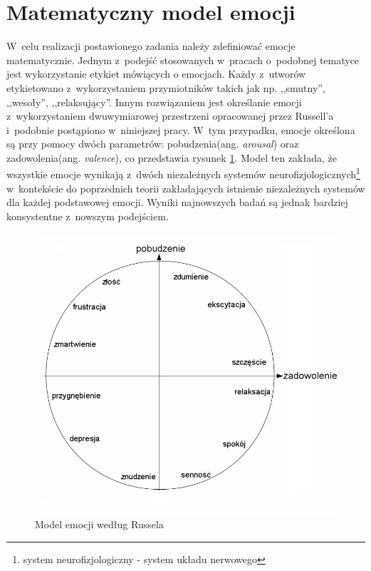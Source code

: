\section{Matematyczny model emocji}\label{rozdzial_modelEmocji}
W~celu realizacji postawionego zadania należy zdefiniować emocje matematycznie. Jednym z~podejść stosowanych w~pracach o~podobnej tematyce jest wykorzystanie etykiet mówiących o emocjach. Każdy z~utworów etykietowano z~wykorzystaniem przymiotników takich jak np. ,,smutny'', ,,wesoły'', ,,relaksujący''.  Innym rozwiązaniem jest określanie emocji z~wykorzystaniem dwuwymiarowej przestrzeni opracowanej przez Russell'a\cite{emotion} i~podobnie postąpiono w~niniejszej pracy. W~tym przypadku, emocje określona są przy pomocy dwóch parametrów: pobudzenia(ang. \emph{arousal}) oraz zadowolenia(ang. \emph{valence}), co przedstawia rysunek \ref{russelModel}. Model ten zakłada, że wszystkie emocje wynikają z~dwóch niezależnych systemów neurofizjologicznych\footnote{system neurofizjologiczny - system układu nerwowego} w~kontekście do poprzednich teorii zakładających istnienie niezależnych systemów dla każdej podstawowej emocji. Wyniki najnowszych badań są jednak bardziej konsystentne z~nowszym podejściem\cite{emotion}.


\begin{figure}[ht!]
\centering
\includegraphics[scale=0.5]{res/emotionModel.png}
\caption{Model emocji według Russela}\label{russelModel}
\end{figure}